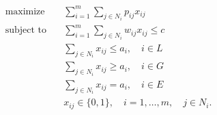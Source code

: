 \begin{align*}
\text{maximize} \quad & \sum_{i=1}^m \sum_{j \in N_i} p_{ij} x_{ij} \\
\text{subject to} \quad & \sum_{i=1}^m \sum_{j \in N_i} w_{ij} x_{ij} \leq c \\
& \sum_{j \in N_i} x_{ij} \leq  a_i, \quad i \in L \\
& \sum_{j \in N_i} x_{ij} \geq  a_i, \quad i \in G \\
& \sum_{j \in N_i} x_{ij} =  a_i, \quad i \in E \\
& x_{ij} \in \lbrace 0, 1 \rbrace, \quad i = 1, \ldots, m, \quad j \in N_i.
\end{align*}


